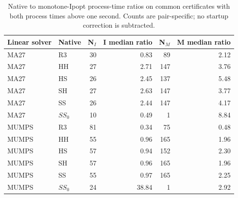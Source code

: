 \documentclass[pdflatex,sn-mathphys-num]{sn-jnl}
\theoremstyle{thmstyleone}
\theoremstyle{thmstylethree}
\begin{document}
\begin{table}[!htbp]
\centering\footnotesize
\caption{Native to monotone-Ipopt process-time ratios on common
certificates with both process times above one second. Counts are
pair-specific; no startup correction is subtracted.}
\label{tab:aligned-over1s}

\begin{tabular}{@{}llrrrr@{}}
\toprule
Linear solver & Native & N$_I$ & I median ratio & N$_M$ & M median ratio\\
\midrule
MA27 & R3 & 30 & 0.83 & 89 & 2.12\\
MA27 & HH & 27 & 2.71 & 147 & 3.76\\
MA27 & HS & 26 & 2.45 & 137 & 5.48\\
MA27 & SH & 27 & 2.63 & 147 & 3.77\\
MA27 & SS & 26 & 2.44 & 147 & 4.17\\
MA27 & $SS_0$ & 10 & 0.49 & 1 & 8.84\\
MUMPS & R3 & 81 & 0.34 & 75 & 0.48\\
MUMPS & HH & 55 & 0.96 & 165 & 1.96\\
MUMPS & HS & 57 & 0.94 & 152 & 2.30\\
MUMPS & SH & 57 & 0.96 & 165 & 1.96\\
MUMPS & SS & 55 & 0.97 & 165 & 2.25\\
MUMPS & $SS_0$ & 24 & 38.84 & 1 & 2.92\\
\bottomrule
\end{tabular}


\end{table}
\end{document}
